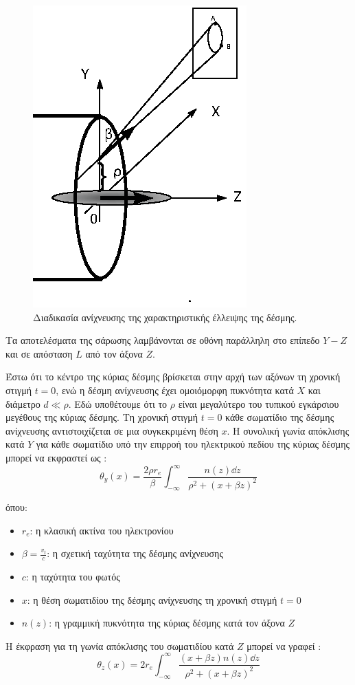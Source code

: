 \begin{figure}[tph]
	\includegraphics[width=0.6\linewidth]{figures/Logatchov1999-EBS}
	\centering
	\caption{Διαδικασία ανίχνευσης της χαρακτηριστικής έλλειψης της δέσμης.}
	\label{fig:ellipse-EBS}
\end{figure}

Τα αποτελέσματα της σάρωσης λαμβάνονται σε οθόνη παράλληλη στο επίπεδο $Y-Z$ και σε απόσταση $L$ από τον άξονα $Z$.

Έστω ότι το κέντρο της κύριας δέσμης βρίσκεται στην αρχή των αξόνων τη χρονική στιγμή $t = 0$, ενώ η δέσμη ανίχνευσης έχει ομοιόμορφη πυκνότητα κατά $X$ και διάμετρο $d \ll \rho$.
Εδώ υποθέτουμε ότι το $\rho$ είναι μεγαλύτερο του τυπικού εγκάρσιου μεγέθους της κύριας δέσμης.
Τη χρονική στιγμή $t = 0$ κάθε  σωματίδιο της δέσμης ανίχνευσης αντιστοιχίζεται σε μια συγκεκριμένη θέση $x$.
Η συνολική γωνία απόκλισης κατά $Y$ για κάθε σωματίδιο υπό την επιρροή του ηλεκτρικού πεδίου της κύριας δέσμης μπορεί να εκφραστεί ως \cite{Logatchov1999}:
\begin{equation} \label{eq:thetayLogatchov1999}
\theta_y (x) = \frac{2 \rho r_e}{\beta} \int_{-\infty}^{\infty}\frac{n(z) \dd z}{\rho^2 + \left(x+\beta z \right) ^2}
\end{equation}

όπου:
\begin{itemize}
\item $r_e$: η κλασική ακτίνα του ηλεκτρονίου
\item $\beta =\frac{v_t}{c}$: η σχετική ταχύτητα της δέσμης ανίχνευσης
\item $c$: η ταχύτητα του φωτός
\item $x$: η θέση σωματιδίου της δέσμης ανίχνευσης τη χρονική στιγμή $t=0$
\item $n(z)$: η γραμμική πυκνότητα της κύριας δέσμης κατά τον άξονα $Z$
\end{itemize} 

Η έκφραση για τη γωνία απόκλισης του σωματιδίου κατά $Z$ μπορεί να γραφεί \cite{Logatchov1999}:
\begin{equation} \label{eq:thetazLogatchov1999}
\theta_z(x) = 2 r_e \int_{-\infty}^{\infty}\frac{(x+\beta z)n(z) \dd z}{\rho^2 + \left(x+\beta z \right) ^2}
\end{equation}